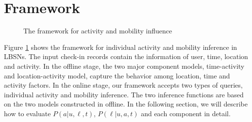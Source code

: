 \section{Framework}
\begin{figure}[t]
\centering
{}
\caption{The framework for activity and mobility influence}
\label{fig:framework}
\end{figure}

Figure \ref{fig:framework} shows the framework for individual activity and mobility inference in LBSNs. The input check-in records contain the information of user, time, location and activity. In the offline stage, the two major component models, time-activity and location-activity model, capture the behavior among location, time and activity factors. In the online stage, our framework accepts two types of queries, individual activity and mobility inference. The two inference functions are based on the two models constructed in offline. In the following section, we will describe how to evaluate $P(a|u, \ell, t)$, $P(\ell | u, a, t)$ and each component in detail.


